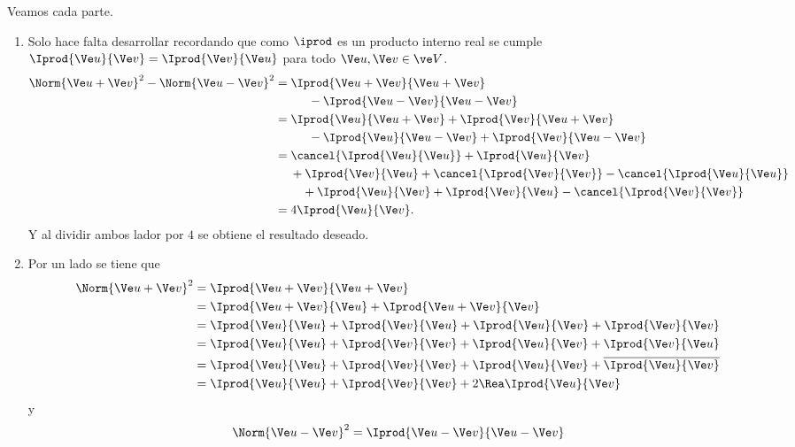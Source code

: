 \begin{sol} Veamos cada parte.
	\begin{enumerate}
		\item Solo hace falta desarrollar recordando que como $\iprod$ es un producto interno real se cumple $\Iprod{\Ve u}{\Ve v}=\Iprod{\Ve v}{\Ve u}$ para todo $\Ve u,\Ve v\in\ve V$.
		\small
		\begin{align*}
		\Norm{\Ve u+\Ve v}^2-\Norm{\Ve u-\Ve v}^2 &= \Iprod{\Ve u+\Ve v}{\Ve u+\Ve v} \\
		&\phantom{=}\hspace{2em}- \Iprod{\Ve u-\Ve v}{\Ve u-\Ve v} \\
		&= \Iprod{\Ve u}{\Ve u+\Ve v} + \Iprod{\Ve v}{\Ve u+\Ve v} \\
		&\phantom{=}\hspace{2em} - \Iprod{\Ve u}{\Ve u-\Ve v} + \Iprod{\Ve v}{\Ve u-\Ve v} \\
		&= \cancel{\Iprod{\Ve u}{\Ve u}} + \Iprod{\Ve u}{\Ve v} \\
		&\phantom{=}\hspace{0.5em} + \Iprod{\Ve v}{\Ve u} + \cancel{\Iprod{\Ve v}{\Ve v}} - \cancel{\Iprod{\Ve u}{\Ve u}} \\
		&\phantom{=}\hspace{1.5em} + \Iprod{\Ve u}{\Ve v} + \Iprod{\Ve v}{\Ve u} - \cancel{\Iprod{\Ve v}{\Ve v}} \\
		&=4\Iprod{\Ve u}{\Ve v}.
		\end{align*}
		\normalsize
		Y al dividir ambos lador por $4$ se obtiene el resultado deseado.
		\item Por un lado se tiene que
		\begin{align*}
		\Norm{\Ve u+\Ve v}^2 &= \Iprod{\Ve u+\Ve v}{\Ve u+\Ve v} \\
							 &= \Iprod{\Ve u+\Ve v}{\Ve u}+\Iprod{\Ve u+\Ve v}{\Ve v} \\
							 &= \Iprod{\Ve u}{\Ve u} + \Iprod{\Ve v}{\Ve u} + \Iprod{\Ve u}{\Ve v} + \Iprod{\Ve v}{\Ve v} \\
							 &=  \Iprod{\Ve u}{\Ve u} + \Iprod{\Ve v}{\Ve v} + \Iprod{\Ve u}{\Ve v} + \Iprod{\Ve v}{\Ve u} \\
							 &= \Iprod{\Ve u}{\Ve u} + \Iprod{\Ve v}{\Ve v} + \Iprod{\Ve u}{\Ve v} + \overline{\Iprod{\Ve u}{\Ve v}} \\
							 &= \Iprod{\Ve u}{\Ve u} + \Iprod{\Ve v}{\Ve v} + 2\Rea\Iprod{\Ve u}{\Ve v}
		\end{align*}
		y
		\begin{align*}
		\Norm{\Ve u-\Ve v}^2 &= \Iprod{\Ve u-\Ve v}{\Ve u-\Ve v} \\

\end{align*}
\end{enumerate}
\end{sol}
